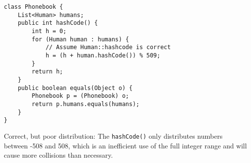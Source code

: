 \question \begin{lstlisting}
class Phonebook {
    List<Human> humans;
    public int hashCode() {
        int h = 0;
        for (Human human : humans) {
            // Assume Human::hashcode is correct
            h = (h + human.hashCode()) % 509;
        }
        return h;
    }
    public boolean equals(Object o) {
        Phonebook p = (Phonebook) o;
        return p.humans.equals(humans);
    }
}
\end{lstlisting}

\begin{solution}[0.25in]
Correct, but poor distribution: The \lstinline$hashCode()$ only distributes numbers between -508 and 508, which is an inefficient use of the full integer range and will cause more collisions than necessary.
\end{solution}
